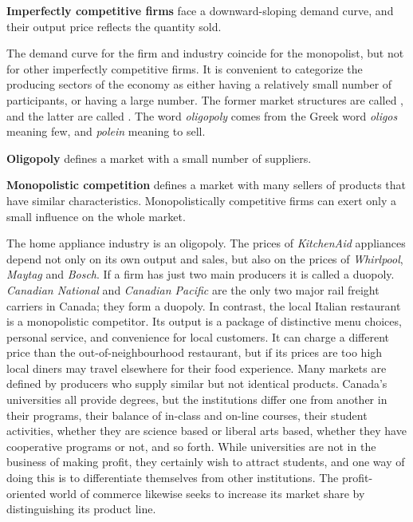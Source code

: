 \begin{DefBox}
	\textbf{Imperfectly competitive firms} face a downward-sloping demand curve, and their output price reflects the quantity sold.
\end{DefBox}

\newhtmlpage

The demand curve for the firm and industry coincide for the monopolist, but
not for other imperfectly competitive firms. It is convenient to categorize
the producing sectors of the economy as either having a relatively small
number of participants, or having a large number. The former market
structures are called , and the latter are called %
. The word \textit{oligopoly}
comes from the Greek word \textit{oligos} meaning few, and \textit{polein}
meaning to sell.

\begin{DefBox}
	\textbf{Oligopoly} defines a market with a small number of suppliers.
	
	\textbf{Monopolistic competition} defines a market with many sellers of products that have similar characteristics. Monopolistically competitive firms can exert only a small influence on the whole market.
\end{DefBox}

The home appliance industry is an oligopoly. The prices of \textit{KitchenAid} 
appliances depend not only on its own output and sales, but also on the
prices of \textit{Whirlpool}, \textit{Maytag} and \textit{Bosch}. If a firm
has just two main producers it is called a duopoly. \textit{Canadian National} 
and \textit{Canadian Pacific} are the only two major rail freight carriers
in Canada; they form a duopoly. In contrast, the local Italian restaurant is
a monopolistic competitor. Its output is a package of distinctive menu
choices, personal service, and convenience for local customers. It can
charge a different price than the out-of-neighbourhood restaurant, but if
its prices are too high local diners may travel elsewhere for their food
experience. Many markets are defined by producers who supply similar but not
identical products. Canada's universities all provide degrees, but the
institutions differ one from another in their programs, their balance of
in-class and on-line courses, their student activities, whether they are
science based or liberal arts based, whether they have cooperative programs
or not, and so forth. While universities are not in the business of making
profit, they certainly wish to attract students, and one way of doing this
is to differentiate themselves from other institutions. The profit-oriented
world of commerce likewise seeks to increase its market share by
distinguishing its product line.

